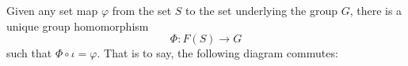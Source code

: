 \documentclass[12pt, a4paper, oneside, openright, titlepage]{book}
\begin{document}
\begin{defn}
        Given any set map $\varphi$ from the set $S$ to the set underlying the group $G$, there is a unique group homomorphism \begin{equation}
                \Phi:F(S) \rightarrow G
        \end{equation}
        such that $\Phi\circ \iota = \varphi$. That is to say, the following diagram commutes: 
        \begin{center}
        \end{center}
\end{defn}
\end{document}
